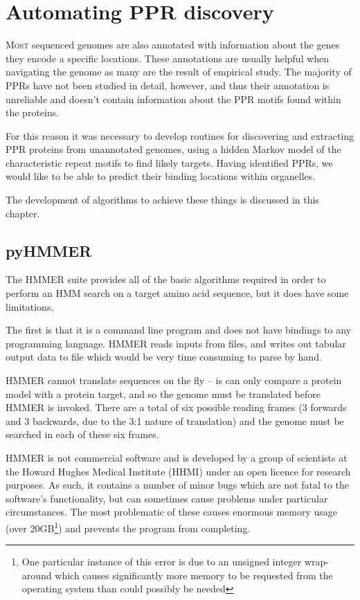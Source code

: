 
\chapter{Automating PPR discovery} 
\label{chap:methods}

\lettrine{M}{ost} 
sequenced genomes are also annotated with information about the genes they
encode a specific locations.
These annotations are usually helpful when navigating the genome as many
are the result of empirical study.
The majority of PPRs have not been studied in detail, however, and thus their
annotation is unreliable and doesn't contain information about 
the PPR motifs found within the proteins.

For this reason it was necessary to develop routines for discovering and
extracting PPR proteins from unannotated genomes, using a hidden Markov model
of the characteristic repeat motifs to find likely targets.
Having identified PPRs, we would like to be able to predict their binding
locations within organelles.

The development of algorithms to achieve these things is discussed in this
chapter.

\section{pyHMMER}
\label{ssec:pyHMMER}

The HMMER suite provides all of the basic algorithms required in order to
perform an HMM search on a target amino acid sequence, but it does have some
limitations.

The first is that it is a command line program and does not have bindings to
any programming language.
HMMER reads inputs from files, and writes out tabular output data to file which
would be very time consuming to parse by hand.

HMMER cannot translate sequences on the fly -- is can only compare a protein 
model with a protein target, and so the genome must be translated before 
HMMER is invoked.
There are a total of six possible reading frames (3 forwards and 3 backwards, 
due to the 3:1 nature of translation) and the genome must be searched in each
of these six frames.

HMMER is not commercial software and is developed by a group of scientists at
the Howard Hughes Medical Institute (HHMI) under an open licence for research
purposes.
As such, it contains a number of minor bugs which are not fatal to the
software's functionality, but can sometimes cause problems
under particular circumstances.
The most problematic of these causes enormous
memory usage (over 20GB\footnote{One particular instance of this error is due
to an unsigned integer wrap-around which causes significantly more memory to be
requested from the operating system than could possibly be needed}) and
prevents the program from completing.

